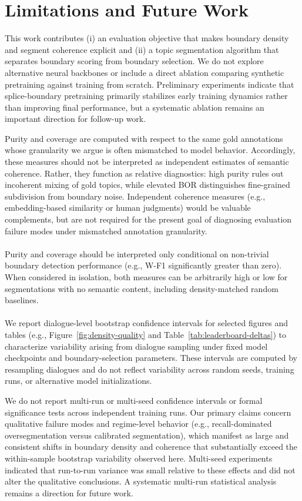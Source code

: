 \documentclass{article}
\makeatletter
\newcommand{\myparagraph}[1]{%
  \paragraph{\@addpunct{#1}}%
}
\makeatother
\begin{document}
\section{Limitations and Future Work}
This work contributes (i) an evaluation objective that makes
boundary density and segment coherence explicit and (ii) a topic
segmentation algorithm that separates boundary scoring from boundary
selection. We do not explore alternative neural backbones or include a
direct ablation comparing synthetic pretraining against training from
scratch. Preliminary experiments indicate that splice-boundary
pretraining primarily stabilizes early training dynamics rather than
improving final performance, but a systematic ablation remains an
important direction for follow-up work.

Purity and coverage are computed with respect to the same gold
annotations whose granularity we argue is often mismatched to model
behavior. Accordingly, these measures should not be interpreted as
independent estimates of semantic coherence. Rather, they function as
relative diagnostics: high purity rules out incoherent mixing of gold
topics, while elevated BOR distinguishes fine-grained subdivision from
boundary noise. Independent coherence measures (e.g., embedding-based
similarity or human judgments) would be valuable complements, but are
not required for the present goal of diagnosing evaluation failure
modes under mismatched annotation granularity.

\myparagraph{Interpretation constraint}
Purity and coverage should be interpreted only conditional on
non-trivial boundary detection performance (e.g., W-F1 significantly
greater than zero). When considered in isolation, both measures can be
arbitrarily high or low for segmentations with no semantic content,
including density-matched random baselines.

\myparagraph{Statistical variability}
We report dialogue-level bootstrap confidence intervals for selected
figures and tables (e.g., Figure~\ref{fig:density-quality} and
Table~\ref{tab:leaderboard-deltas}) to characterize
variability arising from dialogue sampling under fixed model
checkpoints and boundary-selection parameters. These intervals are
computed by resampling dialogues and do not reflect variability across
random seeds, training runs, or alternative model initializations.

We do not report multi-run or multi-seed confidence intervals or formal
significance tests across independent training runs. Our primary
claims concern qualitative failure modes and regime-level behavior
(e.g., recall-dominated oversegmentation versus calibrated
segmentation), which manifest as large and consistent shifts in
boundary density and coherence that substantially exceed the
within-sample bootstrap variability observed here. Multi-seed
experiments indicated that run-to-run variance was small relative to
these effects and did not alter the qualitative conclusions. A
systematic multi-run statistical analysis remains a direction for
future work.
\end{document}

